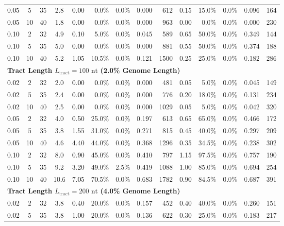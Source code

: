 \begin{table}[t!]
\begin{tabular*}{\textwidth}{@{\extracolsep{\fill}} ccc c rrrrr rrrrr @{}}
0.05 &  5 & 35 &  2.8 &  0.00 &   0.0\% &   0.0\% & 0.000 &   612 &  0.15 &  15.0\% &   0.0\% & 0.096 &   164 \\
0.05 & 10 & 40 &  1.8 &  0.00 &   0.0\% &   0.0\% & 0.000 &   963 &  0.00 &   0.0\% &   0.0\% & 0.000 &   230 \\
0.10 &  2 & 32 &  4.9 &  0.10 &   5.0\% &   0.0\% & 0.045 &   589 &  0.65 &  50.0\% &   0.0\% & 0.349 &   144 \\
0.10 &  5 & 35 &  5.0 &  0.00 &   0.0\% &   0.0\% & 0.000 &   881 &  0.55 &  50.0\% &   0.0\% & 0.374 &   188 \\
0.10 & 10 & 40 &  5.2 &  1.05 &  10.5\% &   0.0\% & 0.121 &  1500 &  0.25 &  25.0\% &   0.0\% & 0.182 &   286 \\
\midrule
\multicolumn{14}{l}{\textbf{Tract Length $L_{\text{tract}} = 100\text{ nt}$ (2.0\% Genome Length)}} \\
0.02 &  2 & 32 &  2.0 &  0.00 &   0.0\% &   0.0\% & 0.000 &   481 &  0.05 &   5.0\% &   0.0\% & 0.045 &   149 \\
0.02 &  5 & 35 &  2.4 &  0.00 &   0.0\% &   0.0\% & 0.000 &   776 &  0.20 &  18.0\% &   0.0\% & 0.131 &   234 \\
0.02 & 10 & 40 &  2.5 &  0.00 &   0.0\% &   0.0\% & 0.000 &  1029 &  0.05 &   5.0\% &   0.0\% & 0.042 &   320 \\
0.05 &  2 & 32 &  4.0 &  0.50 &  25.0\% &   0.0\% & 0.197 &   613 &  0.65 &  65.0\% &   0.0\% & 0.466 &   172 \\
0.05 &  5 & 35 &  3.8 &  1.55 &  31.0\% &   0.0\% & 0.271 &   815 &  0.45 &  40.0\% &   0.0\% & 0.297 &   209 \\
0.05 & 10 & 40 &  4.6 &  4.40 &  44.0\% &   0.0\% & 0.368 &  1296 &  0.35 &  34.5\% &   0.0\% & 0.238 &   302 \\
0.10 &  2 & 32 &  8.0 &  0.90 &  45.0\% &   0.0\% & 0.410 &   797 &  1.15 &  97.5\% &   0.0\% & 0.757 &   190 \\
0.10 &  5 & 35 &  9.2 &  3.20 &  49.0\% &   2.5\% & 0.419 &  1088 &  1.00 &  85.0\% &   0.0\% & 0.694 &   254 \\
0.10 & 10 & 40 & 10.6 &  7.05 &  70.5\% &   0.0\% & 0.683 &  1782 &  0.90 &  84.5\% &   0.0\% & 0.687 &   391 \\
\midrule
\multicolumn{14}{l}{\textbf{Tract Length $L_{\text{tract}} = 200\text{ nt}$ (4.0\% Genome Length)}} \\
0.02 &  2 & 32 &  3.8 &  0.40 &  20.0\% &   0.0\% & 0.157 &   452 &  0.40 &  40.0\% &   0.0\% & 0.260 &   151 \\
0.02 &  5 & 35 &  3.8 &  1.00 &  20.0\% &   0.0\% & 0.136 &   622 &  0.30 &  25.0\% &   0.0\% & 0.183 &   217 \\

\end{tabular*}
\end{table}
